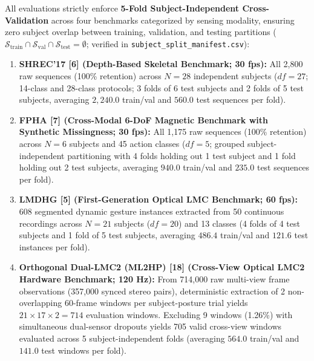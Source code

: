 All evaluations strictly enforce \textbf{5-Fold Subject-Independent Cross-Validation} across four benchmarks categorized by sensing modality, ensuring zero subject overlap between training, validation, and testing partitions ($\mathcal{S}_{\text{train}} \cap \mathcal{S}_{\text{val}} \cap \mathcal{S}_{\text{test}} = \emptyset$; verified in \texttt{subject\_split\_manifest.csv}):
\begin{enumerate}
    \item \textbf{SHREC'17 [6] (Depth-Based Skeletal Benchmark; 30 fps):} All 2,800 raw sequences (100\% retention) across $N=28$ independent subjects ($df=27$; 14-class and 28-class protocols; 3 folds of 6 test subjects and 2 folds of 5 test subjects, averaging $2,240.0$ train/val and $560.0$ test sequences per fold).
    \item \textbf{FPHA [7] (Cross-Modal 6-DoF Magnetic Benchmark with Synthetic Missingness; 30 fps):} All 1,175 raw sequences (100\% retention) across $N=6$ subjects and 45 action classes ($df=5$; grouped subject-independent partitioning with 4 folds holding out 1 test subject and 1 fold holding out 2 test subjects, averaging $940.0$ train/val and $235.0$ test sequences per fold).
    \item \textbf{LMDHG [5] (First-Generation Optical LMC Benchmark; 60 fps):} 608 segmented dynamic gesture instances extracted from 50 continuous recordings across $N=21$ subjects ($df=20$) and 13 classes (4 folds of 4 test subjects and 1 fold of 5 test subjects, averaging $486.4$ train/val and $121.6$ test instances per fold).
    \item \textbf{Orthogonal Dual-LMC2 (ML2HP) [18] (Cross-View Optical LMC2 Hardware Benchmark; 120 Hz):} From 714,000 raw multi-view frame observations (357,000 synced stereo pairs), deterministic extraction of 2 non-overlapping 60-frame windows per subject-posture trial yields $21 \times 17 \times 2 = 714$ evaluation windows. Excluding 9 windows (1.26\%) with simultaneous dual-sensor dropouts yields 705 valid cross-view windows evaluated across 5 subject-independent folds (averaging $564.0$ train/val and $141.0$ test windows per fold).
\end{enumerate}

